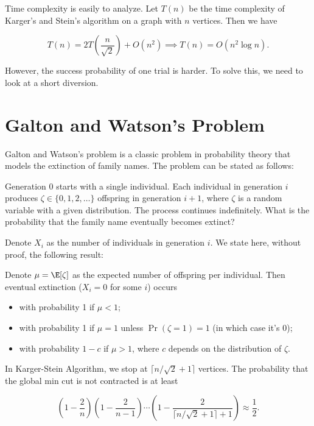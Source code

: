 Time complexity is easily to analyze. Let $T(n)$ be the time complexity of Karger's and Stein's algorithm on a graph with $n$ vertices. Then we have

\[ T(n) = 2T(\frac{n}{\sqrt{2}}) + O(n^2) \implies T(n) = O(n^2 \log n). \]

However, the success probability of one trial is harder. To solve this, we need to look at a short diversion.

\section{Galton and Watson's Problem}

Galton and Watson's problem is a classic problem in probability theory that models the extinction of family names. The problem can be stated as follows:

\begin{problem}
Generation 0 starts with a single individual. Each individual in generation $i$ produces $\zeta\in \{0,1,2,\ldots\}$ offspring in generation $i+1$, where $\zeta$ is a random variable with a given distribution. The process continues indefinitely. What is the probability that the family name eventually becomes extinct?
\end{problem}

Denote $X_i$ as the number of individuals in generation $i$. We state here, without proof, the following result:

\begin{theorem} \label{thm:gw}
	Denote $\mu = \E[\zeta]$ as the expected number of offspring per individual. Then eventual extinction ($X_i = 0$ for some $i$) occurs
	\begin{itemize}
		\item with probability 1 if $\mu < 1$;
		\item with probability 1 if $\mu = 1$ unless $\Pr(\zeta = 1) = 1$ (in which case it's 0);
		\item with probability $1-c$ if $\mu > 1$, where $c$ depends on the distribution of $\zeta$.
	\end{itemize}
\end{theorem}

In Karger-Stein Algorithm, we stop at $\lceil n/\sqrt{2} + 1 \rceil$ vertices. The probability that the global min cut is not contracted is at least

\[
	\left(1-\frac{2}{n}\right)\left(1-\frac{2}{n-1}\right)\cdots \left(1-\frac{2}{\lceil n/\sqrt{2} + 1 \rceil + 1}\right) \approx \frac{1}{2}.
\]

